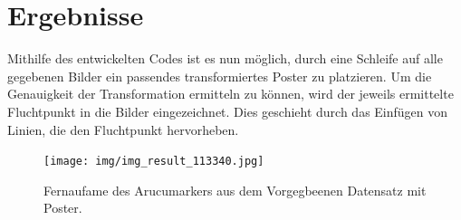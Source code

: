 \documentclass[a4paper,twocolumn]{article}
\begin{document}
\section{Ergebnisse}

Mithilfe des entwickelten Codes ist es nun möglich, durch eine Schleife auf alle gegebenen Bilder ein passendes transformiertes Poster zu platzieren. Um die Genauigkeit der Transformation ermitteln zu können, wird der jeweils ermittelte Fluchtpunkt in die Bilder eingezeichnet. Dies geschieht durch das Einfügen von Linien, die den Fluchtpunkt hervorheben.
\begin{figure}[h!]
    \centering
    \texttt{[image: img/img\_result\_113340.jpg]} %
    \caption{Fernaufame des Arucumarkers aus dem Vorgegbeenen Datensatz mit Poster.}
    \label{fig:example-result}
\end{figure}
\end{document}
